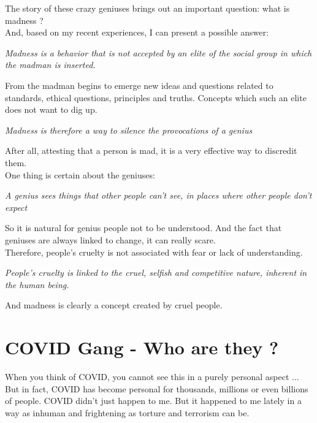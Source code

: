 \documentclass[11pt]{book}
\begin{document}
\noindent The story of these crazy geniuses brings out an important question: what is madness ? \\

\noindent And, based on my recent experiences, I can present a possible answer:

\noindent \begin{center} \emph{Madness is a behavior that is not accepted by an elite of the social group in which the madman is inserted.} \end{center}

\noindent From the madman begins to emerge new ideas and questions related to standards, ethical questions, principles and truths. Concepts which such an elite does not want to dig up.

\noindent \begin{center} \emph{Madness is therefore a way to silence the provocations of a genius} \end{center}

After all, attesting that a person is mad, it is a very effective way to discredit them.  \\

\noindent One thing is certain about the geniuses:

\noindent \begin{center} \emph{A genius sees things that other people can't see, in places where other people don't expect} \end{center}

\noindent So it is natural for genius people not to be understood. And the fact that geniuses are always linked to change, it can really scare. \\

\noindent Therefore, people's cruelty is not associated with fear or lack of understanding.

\noindent \begin{center} \emph{People's cruelty is linked to the cruel, selfish and competitive nature, inherent in the human being.} \end{center}

\noindent And madness is clearly a concept created by cruel people.

\chapter {COVID Gang - Who are they ?}

\noindent When you think of COVID, you cannot see this in a purely personal aspect ... But in fact, COVID has become personal for thousands, millions or even billions of people. COVID didn't just happen to me. But it happened to me lately in a way as inhuman and frightening as torture and terrorism can be. \\
\end{document}
